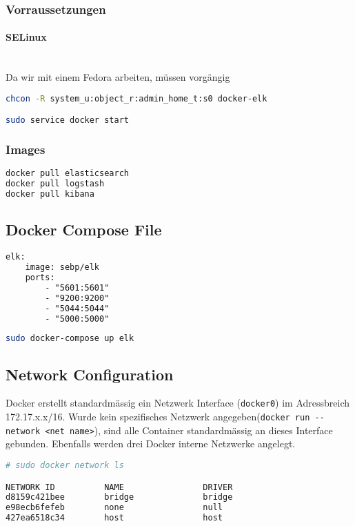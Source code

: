 \subsubsection{Vorraussetzungen}
\paragraph{SELinux} \hfill \\
Da wir mit einem Fedora arbeiten, müssen vorgängig 
\begin{lstlisting}[language=bash]
chcon -R system_u:object_r:admin_home_t:s0 docker-elk

sudo service docker start
\end{lstlisting}

\subsubsection{Images}
\begin{lstlisting}[language=bash]
docker pull elasticsearch
docker pull logstash
docker pull kibana
\end{lstlisting}

\subsection{Docker Compose File}
\begin{lstlisting}[language=xml]
elk:
	image: sebp/elk
	ports:
		- "5601:5601"
		- "9200:9200"
		- "5044:5044"
		- "5000:5000"
\end{lstlisting}

\begin{lstlisting}[language=bash]
sudo docker-compose up elk
\end{lstlisting}


\subsection{Network Configuration}
Docker erstellt standardmässig ein Netzwerk Interface (\lstinline[]|docker0|) im Adressbreich 172.17.x.x/16. Wurde kein spezifisches Netzwerk angegeben(\lstinline[]|docker run --network <net name>|), sind alle Container standardmässig an dieses Interface gebunden. Ebenfalls werden drei Docker interne Netzwerke angelegt.
\begin{lstlisting}[language=bash]
# sudo docker network ls

NETWORK ID          NAME                DRIVER
d8159c421bee        bridge              bridge              
e98ecb6fefeb        none                null                
427ea6518c34        host                host    
\end{lstlisting}

